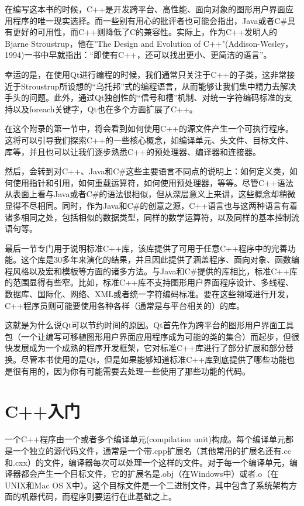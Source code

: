 \documentclass[11pt,oneside]{book}
\begin{document}
\begin{common-format}
在编写这本书的时候，C++是开发跨平台、高性能、面向对象的图形用户界面应用程序的唯一现实选择。而一些别有用心的批评者也可能会指出，Java或者C\#{}具有更好的可用性，而C++则降低了C的兼容性。实际上，作为C++发明人的Bjarne Stroustrup，他在"The Design and Evolution of C++"(Addison-Wesley，1994)一书中早就指出：“即使有C++，还可以找出更小、更简洁的语言”。

幸运的是，在使用Qt进行编程的时候，我们通常只关注于C++的子类，这非常接近于Stroustrup所设想的“乌托邦”式的编程语言，从而能够让我们集中精力去解决手头的问题。此外，通过Qt独创性的“信号和槽”机制、对统一字符编码标准的支持以及foreach关键字，Qt也在多个方面扩展了C++。

在这个附录的第一节中，将会看到如何使用C++的源文件产生一个可执行程序。这将可以引导我们探索C++的一些核心概念，如编译单元、头文件、目标文件、库等，并且也可以让我们逐步熟悉C++的预处理器、编译器和连接器。

然后，会转到对C++、Java和C\#{}这些主要语言不同点的说明上：如何定义类，如何使用指针和引用，如何重载运算符，如何使用预处理器，等等。尽管C++语法从表面上看与Java或者C\#{}的语法很相似，但从深层意义上来讲，这些概念却稍微显得不尽相同。同时，作为Java和C\#{}的创意之源，C++语言也与这两种语言有着诸多相同之处，包括相似的数据类型，同样的数学运算符，以及同样的基本控制流语句等。

最后一节专门用于说明标准C++库，该库提供了可用于任意C++程序中的完善功能。这个库是30多年来演化的结果，并且因此提供了涵盖程序、面向对象、函数编程风格以及宏和模板等方面的诸多方法。与Java和C\#{}提供的库相比，标准C++库的范围显得有些窄。比如，标准C++库不支持图形用户界面程序设计、多线程、数据库、国际化、网络、XML或者统一字符编码标准。要在这些领域进行开发，C++程序员则可能要使用各种各样（通常是与平台相关的）的库。

这就是为什么说Qt可以节约时间的原因。Qt首先作为跨平台的图形用户界面工具包（一个让编写可移植图形用户界面应用程序成为可能的类的集合）而起步，但很快发展成为一个成熟的程序开发框架，它对标准C++库进行了部分扩展和部分替换。尽管本书使用的是Qt，但是如果能够知道标准C++库到底提供了哪些功能也是很有用的，因为你有可能需要去处理一些使用了那些功能的代码。

\section{C++入门}
一个C++程序由一个或者多个编译单元(compilation unit)构成。每个编译单元都是一个独立的源代码文件，通常是一个带.cpp扩展名（其他常用的扩展名还有.cc和.cxx）的文件，编译器每次可以处理一个这样的文件。对于每一个编译单元，编译器都会产生一个目标文件，它的扩展名是.obj（在Windows中）或者.o（在UNIX和Mac OS X中）。这个目标文件是一个二进制文件，其中包含了系统架构方面的机器代码，而程序则要运行在此基础之上。  


\end{common-format}
\end{document}
